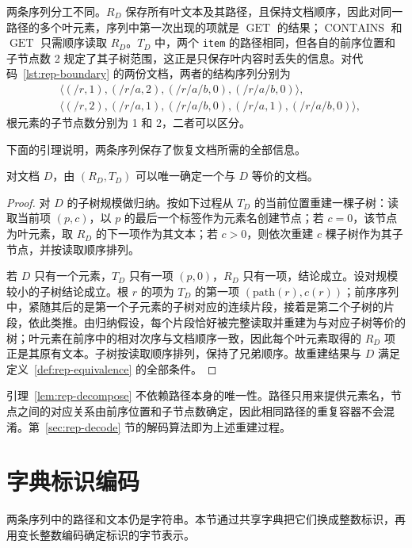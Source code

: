 两条序列分工不同。$R_D$ 保存所有叶文本及其路径，且保持文档顺序，因此对同一路径的多个叶元素，序列中第一次出现的项就是 $\operatorname{GET}$ 的结果；$\operatorname{CONTAINS}$ 和 $\operatorname{GET}$ 只需顺序读取 $R_D$。$T_D$ 中，两个 \texttt{item} 的路径相同，但各自的前序位置和子节点数 2 规定了其子树范围，这正是只保存叶内容时丢失的信息。对代码~\ref{lst:rep-boundary} 的两份文档，两者的结构序列分别为
\[
\begin{aligned}
&\langle(/r,1),(/r/a,2),(/r/a/b,0),(/r/a/b,0)\rangle,\\
&\langle(/r,2),(/r/a,1),(/r/a/b,0),(/r/a,1),(/r/a/b,0)\rangle,
\end{aligned}
\]
根元素的子节点数分别为 1 和 2，二者可以区分。

下面的引理说明，两条序列保存了恢复文档所需的全部信息。

\begin{lemma}
\label{lem:rep-decompose}
对文档 $D$，由 $(R_D,T_D)$ 可以唯一确定一个与 $D$ 等价的文档。
\end{lemma}

\begin{proof}
对 $D$ 的子树规模做归纳。按如下过程从 $T_D$ 的当前位置重建一棵子树：读取当前项 $(p,c)$，以 $p$ 的最后一个标签作为元素名创建节点；若 $c=0$，该节点为叶元素，取 $R_D$ 的下一项作为其文本；若 $c>0$，则依次重建 $c$ 棵子树作为其子节点，并按读取顺序排列。

若 $D$ 只有一个元素，$T_D$ 只有一项 $(p,0)$，$R_D$ 只有一项，结论成立。设对规模较小的子树结论成立。根 $r$ 的项为 $T_D$ 的第一项 $(\mathrm{path}(r),c(r))$；前序序列中，紧随其后的是第一个子元素的子树对应的连续片段，接着是第二个子树的片段，依此类推。由归纳假设，每个片段恰好被完整读取并重建为与对应子树等价的树；叶元素在前序中的相对次序与文档顺序一致，因此每个叶元素取得的 $R_D$ 项正是其原有文本。子树按读取顺序排列，保持了兄弟顺序。故重建结果与 $D$ 满足定义~\ref{def:rep-equivalence} 的全部条件。
\end{proof}

引理~\ref{lem:rep-decompose} 不依赖路径本身的唯一性。路径只用来提供元素名，节点之间的对应关系由前序位置和子节点数确定，因此相同路径的重复容器不会混淆。第~\ref{sec:rep-decode} 节的解码算法即为上述重建过程。

\section{字典标识编码}
\label{sec:rep-dictionary}

两条序列中的路径和文本仍是字符串。本节通过共享字典把它们换成整数标识，再用变长整数编码确定标识的字节表示。


